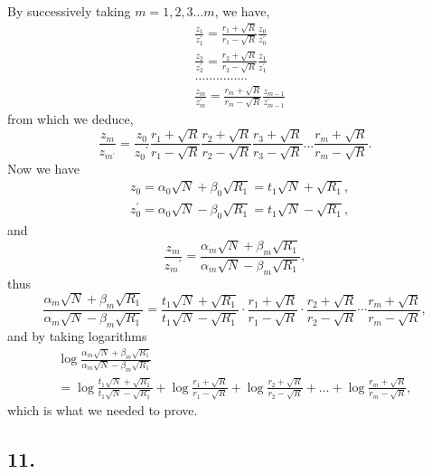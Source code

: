 \documentclass[oneside, 12 pt, leqno]{memoir}
\begin{document}
By successively taking \(m=1,2,3 \dots m\), we have,
\[\begin{aligned}
&\frac{z_1}{z_1^{\prime}}=\frac{r_1+\sqrt{R}}{r_1-\sqrt{R}} \frac{z_0}{z_0^{\prime}} \\
&\frac{z_2}{z_2^{\prime}}=\frac{r_2+\sqrt{R}}{r_2-\sqrt{R}} \frac{z_1}{z_1^{\prime}} \\
&\dots \dots \dots \dots \dots \\
&\frac{z_m}{z_m^{\prime}}=\frac{r_m+\sqrt{R}}{r_m-\sqrt{R}} \frac{z_{m-1}}{z_{m-1}^{\prime}}
\end{aligned}\]
from which we deduce,
\[\frac{z_m}{z_{m^{\prime}}}=\frac{z_0}{z_0{ }^{\prime}} \frac{r_1+\sqrt{R}}{r_1-\sqrt{R}} \frac{r_2+\sqrt{R}}{r_2-\sqrt{R}} \frac{r_3+\sqrt{R}}{r_3-\sqrt{R}} \dots \frac{r_m+\sqrt{R}}{r_m-\sqrt{R}}.\]
Now we have
\[\begin{aligned}
& z_0=\alpha_0 \sqrt{N}+\beta_0 \sqrt{R_1}=t_1 \sqrt{N}+\sqrt{R_1}, \\
& z_0^{\prime}=\alpha_0 \sqrt{N}-\beta_0 \sqrt{R_1}=t_1 \sqrt{N}-\sqrt{R_1},
\end{aligned}\]
and
\[\frac{z_m}{{z_m}^{\prime}}=\frac{\alpha_m \sqrt{N}+\beta_m \sqrt{R_1}}{\alpha_m \sqrt{N}-\beta_m \sqrt{R_1}},\]
thus
\[\frac{\alpha_m \sqrt{N}+\beta_m \sqrt{R_1}}{\alpha_m \sqrt{N}-\beta_m \sqrt{R_1}}=\frac{t_1 \sqrt{N}+\sqrt{R_1}}{t_1 \sqrt{N}-\sqrt{R_1}} \cdot \frac{r_1+\sqrt{R}}{r_1-\sqrt{R}} \cdot \frac{r_2+\sqrt{R}}{r_2-\sqrt{R}} \cdots \frac{r_m+\sqrt{R}}{r_m-\sqrt{R}},\]
and by taking logarithms
\begin{gather*}
\tag{26}\log \frac{\alpha_m \sqrt{N}+\beta_m \sqrt{R_1}}{\alpha_m \sqrt{N}-\beta_m \sqrt{R_1}} \\
=\log \frac{t_1 \sqrt{N}+\sqrt{R_1}}{t_1 \sqrt{N}-\sqrt{R_1}}+\log \frac{r_1+\sqrt{R}}{r_1-\sqrt{R}}+\log \frac{r_2+\sqrt{R}}{r_2-\sqrt{R}}+\dots+\log \frac{r_m+\sqrt{R}}{r_m-\sqrt{R}},
\end{gather*}
which is what we needed to prove.

\subsection*{11.}
\end{document}
